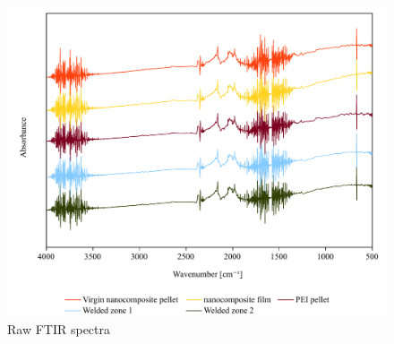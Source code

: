 \documentclass[11pt,review,times]{elsarticle}
\begin{document}
\begin{figure}[h]
	\center
	\includegraphics[width=\textwidth]{FTIR_spectra.pdf}
	\caption{Raw FTIR spectra}
	\label{fig:FTIR_spectra}
\end{figure}
\end{document}
